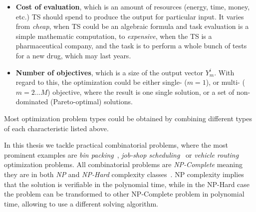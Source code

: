 \begin{itemize}
	\item \textbf{Cost of evaluation}, which is an amount of resources (energy, time, money, etc.) TS should spend to produce the output for particular input. It varies from \emph{cheap}, when TS could be an algebraic formula and task evaluation is a simple mathematic computation, to \emph{expensive}, when the TS is a pharmaceutical company, and the task is to perform a whole bunch of tests for a new drug, which may last years. 

	\item \textbf{Number of objectives}, which is a size of the output vector $Y_m^i$. With regard to this, the optimization could be either single- ($m=1$), or multi- ($m=2...M$) objective, where the result is one single solution, or a set of non-dominated (Pareto-optimal) solutions.
\end{itemize}

Most optimization problem types could be obtained by combining different types of each characteristic listed above.

In this thesis we tackle practical combinatorial problems, where the most prominent examples are \emph{bin packing}~\cite{martello1990bin}, \emph{job-shop scheduling}~\cite{blazewicz1996job} or \emph{vehicle routing}~\cite{toth2002vehicle} optimization problems.
All combinatorial problems are \emph{NP-Complete} meaning they are in both \emph{NP} and \emph{NP-Hard} complexity classes~\cite{garey1979computers}. NP complexity implies that the solution is verifiable in the polynomial time, while in the NP-Hard case the problem can be transformed to other NP-Complete problem in polynomial time, allowing to use a different solving algorithm.

